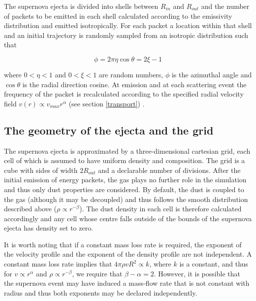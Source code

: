 \documentclass[useAMS,usenatbib,usegraphicx]{mnras}
\begin{document}
The supernova ejecta is divided into shells between $R_{in}$ and $R_{out}$ and the number of packets to be emitted in each shell calculated according to the emissivity distribution and emitted isotropically.  For each packet a location within that shell and an initial trajectory is randomly sampled from an isotropic distribution such that 

\begin{equation}
\phi=2\pi\eta
 \cos \theta=2\xi -1
\end{equation}

\noindent where $0<\eta<1$ and $0<\xi<1$ are random numbers, $\phi$ is the azimuthal angle and $\cos \theta$ is the radial direction cosine.  At emission and at each scattering event the frequency of the packet is recalculated according to the specified radial velocity field $v(r) \propto v_{max}r^{\alpha}$ (see section \ref{transport}) .




\subsection{The geometry of the ejecta and the grid}
\label{grid}
The supernova ejecta is approximated by a three-dimensional cartesian grid, each cell of which is assumed to have uniform density and composition.  The grid is a cube with  sides of width $2R_{out}$ and a declarable number of divisions.  After the initial emission of energy packets, the gas plays no further role in the simulation and thus only dust properties are considered.  By default, the dust is coupled to the gas (although it may be decoupled) and thus follows the smooth distribution described above ($\rho \propto r^{-\beta}$).  The dust density in each cell is therefore calculated accordingly and any cell whose centre falls outside of the bounds of the supernova ejecta has density set to zero.  

It is worth noting that if a constant mass loss rate is required, the exponent of the velocity profile and the exponent of the density profile are not independent.  A constant mass loss rate implies that $4\pi \rho vR^2  \propto k$, where $k$ is a constant, and thus for $v \propto r^\alpha$ and $\rho\propto r^{-\beta}$, we require that $\beta-\alpha=2$.  However,  it is possible that the supernova event may have induced a mass-flow rate that is not constant with radius and thus both exponents may be declared independently.
\end{document}
